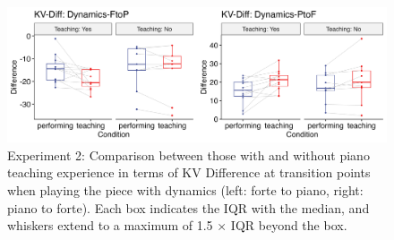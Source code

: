 \documentclass[
  man,floatsintext]{apa6}
\begin{document}
\begin{figure}
\includegraphics[width=1\linewidth]{manuscript_files/figure-latex/plot-dyn-diff-teaching-2-1} \caption{\label{fig:dyn-diff-teaching-2}Experiment 2: Comparison between those with and without piano teaching experience in terms of KV Difference at transition points when playing the piece with dynamics (left: forte to piano, right: piano to forte). Each box indicates the IQR with the median, and whiskers extend to a maximum of 1.5 × IQR beyond the box.}\label{fig:plot-dyn-diff-teaching-2}
\end{figure}
\end{document}
